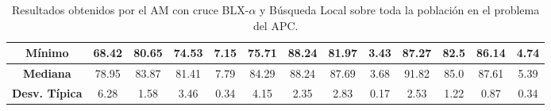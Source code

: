 \documentclass[11pt,a4paper]{article}
\begin{document}
\begin{table}[H]
{\begin{tabular}{c|c|c|c|c|c|c|c|c|c|c|c|c|}
\multicolumn{1}{|c|}{\textbf{Mínimo}}       & 68.42             & 80.65                   & 74.53         & 7.15       & 75.71             & 88.24          & 81.97         & 3.43       & 87.27             & 82.5           & 86.14         & 4.74       \\ \hline
\multicolumn{1}{|c|}{\textbf{Mediana}}      & 78.95             & 83.87                   & 81.41         & 7.79       & 84.29             & 88.24          & 87.69         & 3.68       & 91.82             & 85.0           & 87.61         & 5.39       \\ \hline
\multicolumn{1}{|c|}{\textbf{Desv. Típica}} & 6.28              & 1.58                    & 3.46          & 0.34       & 4.15              & 2.35           & 2.83          & 0.17       & 2.53              & 1.22           & 0.87          & 0.34       \\ \hline
\end{tabular}
}%
\caption{Resultados obtenidos por el AM con cruce BLX-$\alpha$ y Búsqueda Local sobre toda la población en el problema del
APC.}
\end{table}
\end{document}
